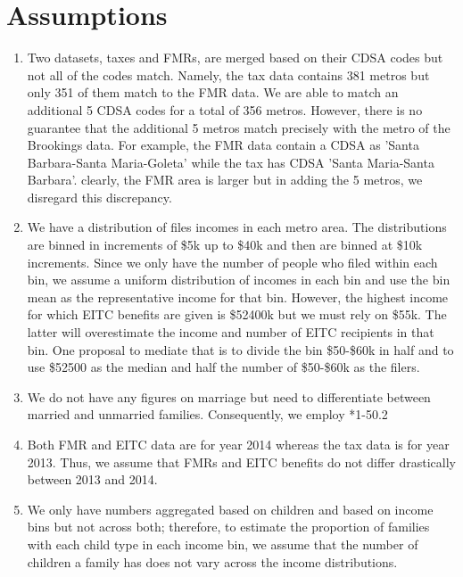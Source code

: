 \documentclass[11pt,a4paper]{article}
\begin{document}
	\section{Assumptions}
	\begin{enumerate}[1.]
		\item Two datasets, taxes and FMRs, are merged based on their CDSA codes but not all of the codes match. Namely, the tax data contains 381 metros but only 351 of them match to the FMR data. We are able to match an additional 5 CDSA codes for a total of 356 metros. However, there is no guarantee that the additional 5 metros match precisely with the metro of the Brookings data. For example, the FMR data contain a CDSA as 'Santa Barbara-Santa Maria-Goleta' while the tax has CDSA 'Santa Maria-Santa Barbara'. clearly, the FMR area is larger but in adding the 5 metros, we disregard this discrepancy. 
		
		\item We have a distribution of files incomes in each metro area. The distributions are binned in increments of \$5k up to \$40k and then are binned at \$10k increments. Since we only have the number of people who filed within each bin, we assume a uniform distribution of incomes in each bin and use the bin mean as the representative income for that bin. However, the highest income for which EITC benefits are given is \$52400k but we must rely on \$55k. The latter will overestimate the income and number of EITC recipients in that bin. One proposal to mediate that is to divide the bin \$50-\$60k in half and to use \$52500 as the median and half the number of \$50-\$60k as the filers.
		
		\item We do not have any figures on marriage but need to differentiate between married and unmarried families. Consequently, we employ *1-50.2%
		
		\item Both FMR and EITC data are for year 2014 whereas the tax data is for year 2013. Thus, we assume that FMRs and EITC benefits do not differ drastically between 2013 and 2014. 
		
		\item We only have numbers aggregated based on children and based on income bins but not across both; therefore, to estimate the proportion of families with each child type in each income bin, we assume that the number of children a family has does not vary across the income distributions. 
	

\end{enumerate}
\end{document}
